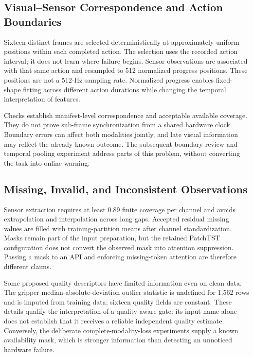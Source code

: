 \subsection{Visual--Sensor Correspondence and Action Boundaries}
Sixteen distinct frames are selected deterministically at approximately uniform
positions within each completed action. The selection uses the recorded action interval;
it does not learn where failure begins. Sensor observations are associated with that
same action and resampled to 512 normalized progress positions. These positions are not
a 512-Hz sampling rate. Normalized progress enables fixed-shape fitting across different
action durations while changing the temporal interpretation of features.

Checks establish manifest-level correspondence and acceptable available coverage. They
do not prove sub-frame synchronization from a shared hardware clock. Boundary errors can
affect both modalities jointly, and late visual information may reflect the already
known outcome. The subsequent boundary review and temporal pooling experiment address
parts of this problem, without converting the task into online warning.

\subsection{Missing, Invalid, and Inconsistent Observations}
Sensor extraction requires at least 0.89 finite coverage per channel and avoids
extrapolation and interpolation across long gaps. Accepted residual missing values are
filled with training-partition means after channel standardization. Masks remain part of
the input preparation, but the retained PatchTST configuration does not convert the
observed mask into attention suppression. Passing a mask to an API and enforcing
missing-token attention are therefore different claims.

Some proposed quality descriptors have limited information even on clean data. The
gripper median-absolute-deviation outlier statistic is undefined for 1,562 rows and is
imputed from training data; sixteen quality fields are constant. These details qualify
the interpretation of a quality-aware gate: its input name alone does not establish that
it receives a reliable independent quality estimate. Conversely, the deliberate
complete-modality-loss experiments supply a known availability mask, which is stronger
information than detecting an unnoticed hardware failure.

